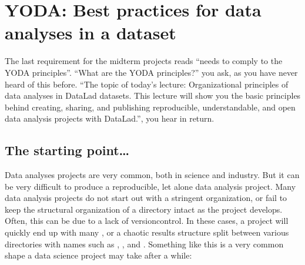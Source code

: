 \ignorespaces 

\section{YODA: Best practices for data analyses in a dataset}
\label{\detokenize{basics/101-127-yoda:yoda-best-practices-for-data-analyses-in-a-dataset}}\label{\detokenize{basics/101-127-yoda:yoda}}\label{\detokenize{basics/101-127-yoda:id1}}\label{\detokenize{basics/101-127-yoda:index-0}}\label{\detokenize{basics/101-127-yoda::doc}}
\sphinxAtStartPar
The last requirement for the midterm projects reads “needs to comply to the
YODA principles”.
“What are the YODA principles?” you ask, as you have never heard of this
before.
“The topic of today’s lecture: Organizational principles of data
analyses in DataLad datasets. This lecture will show you the basic
principles behind creating, sharing, and publishing reproducible,
understandable, and open data analysis projects with DataLad.”, you
hear in return.


\subsection{The starting point…}
\label{\detokenize{basics/101-127-yoda:the-starting-point}}
\sphinxAtStartPar
Data analyses projects are very common, both in science and industry.
But it can be very difficult to produce a reproducible, let alone
 data analysis project.
Many data analysis projects do not start out with
a stringent organization, or fail to keep the structural organization of a
directory intact as the project develops. Often, this can be due to a lack of
version\sphinxhyphen{}control. In these cases, a project will quickly end up
with many
,
or a chaotic results structure split between various directories with names
such as , ,  and
. Something like this is a very
common shape a data science project may take after a while:

